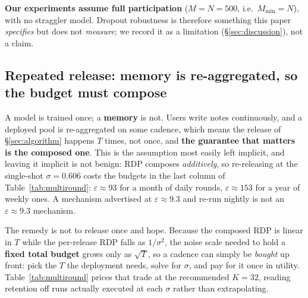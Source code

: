 \documentclass[pdflatex,sn-mathphys-num,12pt]{sn-jnl}
\theoremstyle{thmstyleone}%
\theoremstyle{thmstyletwo}%
\theoremstyle{thmstylethree}%
\newcommand{\eps}{\varepsilon}
\newcommand{\secref}[1]{\S\ref{#1}}
\begin{document}
\textbf{Our experiments assume full participation} ($M = N = 500$, i.e.\
$M_{\min} = N$), with no straggler model. Dropout robustness is therefore something
this paper \emph{specifies} but does not \emph{measure}; we record it as a limitation
(\secref{sec:discussion}), not a claim.

\subsection{Repeated release: memory is re-aggregated, so the budget must
compose}\label{sec:multiround}

A model is trained once; a \textbf{memory} is not. Users write notes continuously, and
a deployed pool is re-aggregated on some cadence, which means the release of
\secref{sec:algorithm} happens $T$ times, not once, and \textbf{the guarantee that
matters is the composed one}. This is the assumption most easily left implicit, and
leaving it implicit is not benign: RDP composes \emph{additively}, so re-releasing at
the single-shot $\sigma = 0.606$ costs the budgets in the last column of
Table~\ref{tab:multiround}: $\eps \approx 93$ for a month of daily rounds, $\eps
\approx 153$ for a year of weekly ones. A mechanism advertised at $\eps \approx 9.3$
and re-run nightly is not an $\eps \approx 9.3$ mechanism.

The remedy is not to release once and hope. Because the composed RDP is linear in $T$
while the per-release RDP falls as $1/\sigma^{2}$, the noise scale needed to hold a
\textbf{fixed total budget} grows only as $\sqrt{T}$, so a cadence can simply be
\emph{bought} up front: pick the $T$ the deployment needs, solve for $\sigma$, and pay
for it once in utility. Table~\ref{tab:multiround} prices that trade at the recommended
$K = 32$, reading retention off runs actually executed at each $\sigma$ rather than
extrapolating.
\end{document}
